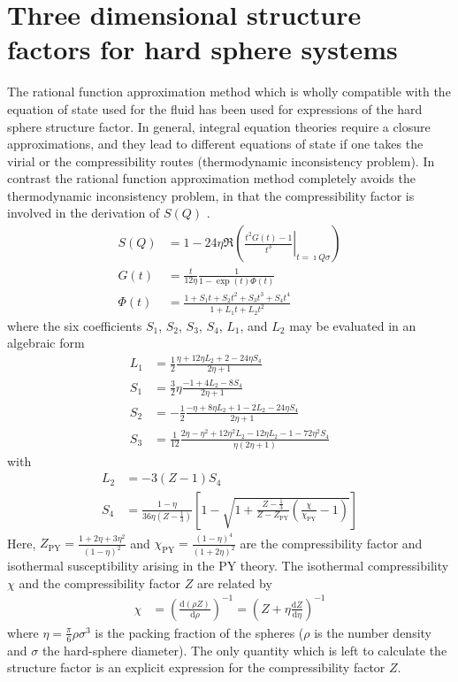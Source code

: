 \section{Three dimensional structure factors for hard sphere systems} \hspace{1pt}
The rational function approximation method which is wholly compatible
with the equation of state used for the fluid has been used for expressions of the hard sphere structure factor.
In general, integral equation theories require a closure approximations, and they lead to different equations of state if one takes
the virial or the compressibility routes (thermodynamic inconsistency problem). In contrast the rational function approximation method
completely avoids the thermodynamic inconsistency problem, in that the compressibility factor is involved in the derivation of $S(Q)$ \cite{Yuste1996,Robles1997,Haro2004}.
\begin{align}
S(Q) &= 1-24\eta\Re\left(\left.\frac{t^2G(t)-1}{t^3}\right|_{t=\imath Q\sigma}\right) \label{eq:RFAstart}\\
G(t) &= \frac{t}{12\eta}\frac{1}{1-\exp(t)\Phi(t)} \\
\Phi(t) &= \frac{1+S_1 t + S_2 t^2 + S_3 t^3 + S_4 t^4}{1+L_1 t + L_2 t^2}
\end{align}
where the six coefficients $S_1$, $S_2$, $S_3$, $S_4$, $L_1$, and $L_2$ may be evaluated in an
algebraic form
\begin{align}
L_1 &= \frac{1}{2} \frac{\eta + 12\eta L_2 + 2 - 24\eta S_4}{2\eta + 1} \\
S_1 &= \frac{3}{2}\eta\frac{-1+4L_2-8S_4}{2\eta +1}\\
S_2 &= -\frac{1}{2} \frac{-\eta+8\eta L_2+1-2L_2-24\eta S_4}{2\eta +1} \\
S_3 &= \frac{1}{12} \frac{2\eta-\eta^2+12\eta^2L_2-12\eta L_2-1-72\eta^2 S_4}{\eta(2\eta+1)}
\end{align}
with
\begin{align}
L_2 &= -3\left(Z-1\right)S_4 \\
S_4 &= \frac{1-\eta}{36\eta\left(Z-\frac{1}{3}\right)}\left[1-\sqrt{1+\frac{Z-\frac{1}{3}}{Z-Z_\mathrm{PY}}\left(\frac{\chi}{\chi_\mathrm{PY}}-1\right)}\right]
\end{align}
Here, $Z_\mathrm{PY} = \frac{1+2\eta+3\eta^2}{(1-\eta)^2}$ and $\chi_\mathrm{PY} = \frac{(1-\eta)^4}{(1+2\eta)^2}$ are the compressibility factor and isothermal susceptibility arising in the PY theory. The isothermal compressibility $\chi$ and the compressibility factor $Z$ are related by
\begin{align}
\chi &= \left(\frac{\mathrm{d}(\rho Z)}{\mathrm{d}\rho}\right)^{-1} = \left(Z+\eta\frac{\mathrm{d} Z}{\mathrm{d}\eta}\right)^{-1}
\label{eq:RFAend}
\end{align}
where $\eta = \frac{\pi}{6}\rho \sigma^3$ is the packing fraction of the spheres ($\rho$ is the number density and $\sigma$ the
hard-sphere diameter).
The only quantity which is left to calculate the structure factor is an explicit expression for the compressibility factor $Z$.

